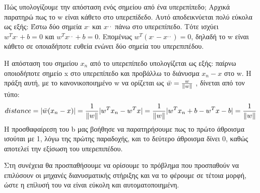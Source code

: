 Πώς υπολογίζουμε την απόσταση ενός σημείου από ένα υπερεπίπεδο;
Αρχικά παρατηρώ πως το w είναι κάθετο στο υπερεπίδεδο. Αυτό αποδεικνύεται πολύ εύκολα ως εξής: Έστω δύο σημεία $x^,$ και $x^{,,}$ πάνω στο υπερεπίπεδο. Τότε ισχύει $w^T  x^, + b = 0$ και $w^T  x^{,,} + b = 0$. Επομένως $w^T (x^, -  x^{,,}) = 0$, δηλαδή το w είναι κάθετο σε οποιαδήποτε ευθεία ενώνει δύο σημεία του υπερεπιπέδου.

Η απόσταση του σημείου $x_n$ από το υπερεπίπεδο υπολογίζεται ως εξής: παίρνω οποιοδήποτε σημείο x στο υπερεπίπεδο και προβάλλω το διάνυσμα $x_n - x$ στο w. Η πράξη αυτή, με το κανονικοποιημένο w να ορίζεται ως $\bar{w}=\frac{w}{\left\lVert w\right\rVert}$ , δίνεται από τον τύπο:
\begin{equation}
distance=\lvert\bar{w} (x_n -x)\rvert =\frac{1}{\left\lVert w\right\rVert} \lvert w^T x_n - w^T x\rvert
=\frac{1}{\left\lVert w\right\rVert} \lvert w^T x_n  +b - w^T x -b\rvert=\frac{1}{\left\lVert w\right\rVert} 
\end{equation}
Η προσθαφαίρεση του b μας βοήθησε να παρατηρήσουμε πως το πρώτο άθροισμα ισούται με 1, λόγω της πρώτης παραδοχής, και το δεύτερο άθροισμα δίνει 0, καθώς αποτελεί την εξίσωση του υπερεπιπέδου.

Στη συνέχεια θα προσπαθήσουμε να ορίσουμε το πρόβλημα που προσπαθούν να επιλύσουν οι μηχανές διανυσματικής στήριξης και να το φέρουμε σε τέτοια μορφή, ώστε η επίλυσή του να είναι εύκολη και αυτοματοποιημένη.

